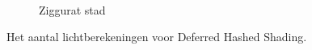 \begin{figure}[t]
\begin{minipage}[t]{0.5\textwidth}
\begin{adjustbox}{minipage=\textwidth, scale=0.55}
\begin{subfigure}[b]{1.6\textwidth}
      \vspace{4pt}
      \label{fig:hs-compare-frames:lc:alley}
    \end{subfigure}
  \end{adjustbox} \\
  \begin{adjustbox}{minipage=\textwidth, scale=0.55}
    \begin{subfigure}[b]{1.6\textwidth}
      \centering
      \def\svgwidth{\textwidth}
      
      \caption{Ziggurat stad}
      \label{fig:hs-compare-frames:lc:city}
    \end{subfigure}
  \end{adjustbox}
  \caption{\small Het aantal lichtberekeningen voor Deferred Hashed Shading.}
  \label{fig:hs-compare-frames:lc}
  \end{minipage}%
\end{figure}
